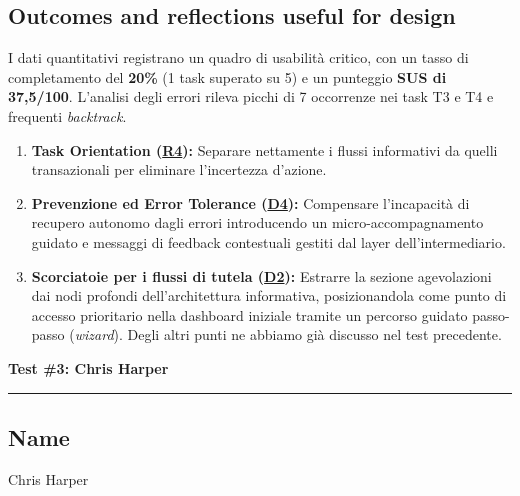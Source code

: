 \documentclass[11pt,a4paper]{article}
\begin{document}
\subsection*{Outcomes and reflections useful for design}
\begin{tcolorbox}[colback=backgroundColor,colframe=borderColor,arc=2mm]
I dati quantitativi registrano un quadro di usabilità critico, con un tasso di completamento del \textbf{20\%} (1 task superato su 5) e un punteggio \textbf{SUS di 37,5/100}. L'analisi degli errori rileva picchi di 7 occorrenze nei task T3 e T4 e frequenti \textit{backtrack}.

\medskip
\begin{enumerate}[leftmargin=*]
    \item \textbf{Task Orientation (\hyperref[iss:R4]{R4}):} Separare nettamente i flussi informativi da quelli transazionali per eliminare l'incertezza d'azione.
    \item \textbf{Prevenzione ed Error Tolerance (\hyperref[iss:D4]{D4}):} Compensare l'incapacità di recupero autonomo dagli errori introducendo un micro-accompagnamento guidato e messaggi di feedback contestuali gestiti dal layer dell'intermediario.
    \item     \textbf{Scorciatoie per i flussi di tutela (\hyperref[iss:D2]{D2}):} Estrarre la sezione agevolazioni dai nodi profondi dell'architettura informativa, posizionandola come punto di accesso prioritario nella dashboard iniziale tramite un percorso guidato passo-passo (\textit{wizard}).
    Degli altri punti ne abbiamo già discusso nel test precedente.
\end{enumerate}
\end{tcolorbox}


\newpage
\begin{center}
  {\color{primaryColor}\large\bfseries Test \#3: Chris Harper}\\
  \vspace{0.1cm}
  \color{borderColor}\hrule
\end{center}

\vspace{0.5cm}

\subsection*{Name \normalfont\small\itshape}
\begin{tcolorbox}[colback=backgroundColor,colframe=borderColor,arc=2mm]
Chris Harper
\end{tcolorbox}
\end{document}

